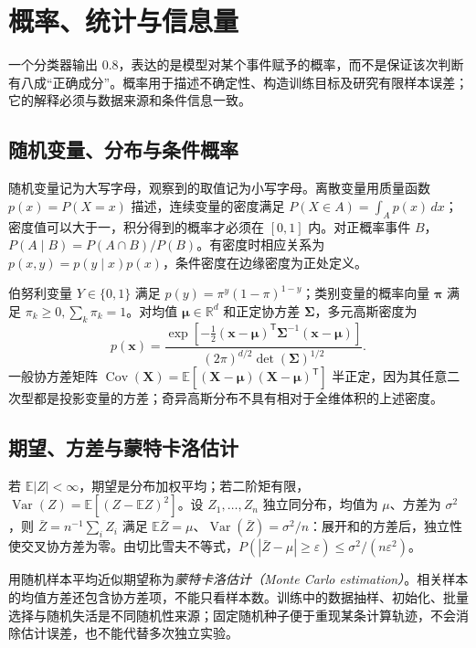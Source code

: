 \setcounter{chapter}{2} %
\chapter{概率、统计与信息量}
\label{chap:dl-probability}
一个分类器输出 $0.8$，表达的是模型对某个事件赋予的概率，而不是保证该次判断有八成“正确成分”。概率用于描述不确定性、构造训练目标及研究有限样本误差；它的解释必须与数据来源和条件信息一致。

\section{随机变量、分布与条件概率}
随机变量记为大写字母，观察到的取值记为小写字母。离散变量用质量函数 $p(x)=P(X=x)$ 描述，连续变量的密度满足 $P(X\in A)=\int_Ap(x)\,dx$；密度值可以大于一，积分得到的概率才必须在 $[0,1]$ 内。对正概率事件 $B$，$P(A\mid B)=P(A\cap B)/P(B)$。有密度时相应关系为 $p(x,y)=p(y\mid x)p(x)$，条件密度在边缘密度为正处定义。

伯努利变量 $Y\in\{0,1\}$ 满足 $p(y)=\pi^y(1-\pi)^{1-y}$；类别变量的概率向量 $\boldsymbol\pi$ 满足 $\pi_k\geq0,\sum_k\pi_k=1$。对均值 $\boldsymbol\mu\in\mathbb R^d$ 和正定协方差 $\boldsymbol\Sigma$，多元高斯密度为
\[
p(\mathbf x)=\frac{\exp[-\frac12(\mathbf x-\boldsymbol\mu)^\mathsf T\boldsymbol\Sigma^{-1}(\mathbf x-\boldsymbol\mu)]}{(2\pi)^{d/2}\det(\boldsymbol\Sigma)^{1/2}}.
\]
一般协方差矩阵 $\operatorname{Cov}(\mathbf X)=\mathbb E[(\mathbf X-\boldsymbol\mu)(\mathbf X-\boldsymbol\mu)^\mathsf T]$ 半正定，因为其任意二次型都是投影变量的方差；奇异高斯分布不具有相对于全维体积的上述密度。

\section{期望、方差与蒙特卡洛估计}
若 $\mathbb E|Z|<\infty$，期望是分布加权平均；若二阶矩有限，$\operatorname{Var}(Z)=\mathbb E[(Z-\mathbb EZ)^2]$。设 $Z_1,\ldots,Z_n$ 独立同分布，均值为 $\mu$、方差为 $\sigma^2$，则 $\bar Z=n^{-1}\sum_iZ_i$ 满足 $\mathbb E\bar Z=\mu$、$\operatorname{Var}(\bar Z)=\sigma^2/n$：展开和的方差后，独立性使交叉协方差为零。由切比雪夫不等式，$P(|\bar Z-\mu|\geq\varepsilon)\leq\sigma^2/(n\varepsilon^2)$。

用随机样本平均近似期望称为\emph{蒙特卡洛估计（Monte Carlo estimation）}。相关样本的均值方差还包含协方差项，不能只看样本数。训练中的数据抽样、初始化、批量选择与随机失活是不同随机性来源；固定随机种子便于重现某条计算轨迹，不会消除估计误差，也不能代替多次独立实验。


